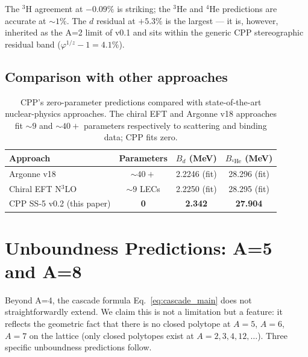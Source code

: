 \documentclass[11pt,letterpaper]{article}
\newcommand{\phig}{\varphi}
\newcommand{\Bd}{B_{d}}
\begin{document}
The ${}^{3}\mathrm{H}$ agreement at $-0.09\%$ is striking; the ${}^{3}\mathrm{He}$ and ${}^{4}\mathrm{He}$ predictions are accurate at $\sim 1\%$. The $d$ residual at $+5.3\%$ is the largest --- it is, however, inherited as the A=2 limit of v0.1 and sits within the generic CPP stereographic residual band ($\phig^{1/z} - 1 = 4.1\%$).

\subsection{Comparison with other approaches}

\begin{table}[H]
\centering
\caption{CPP's zero-parameter predictions compared with state-of-the-art nuclear-physics approaches. The chiral EFT and Argonne v18 approaches fit $\sim 9$ and $\sim 40+$ parameters respectively to scattering and binding data; CPP fits zero.}
\label{tab:comparison}
\begin{tabular}{@{}lccc@{}}
\toprule
Approach & Parameters & $\Bd$ (MeV) & $B_{^{4}\mathrm{He}}$ (MeV) \\
\midrule
Argonne v18 \citep{argonne_v18} & $\sim 40+$ & 2.2246 (fit) & 28.296 (fit) \\
Chiral EFT N$^{3}$LO & $\sim 9$ LECs & 2.2250 (fit) & 28.295 (fit) \\
CPP SS-5 v0.2 (this paper) & \textbf{0} & \textbf{2.342} & \textbf{27.904} \\
\bottomrule
\end{tabular}
\end{table}

\section{Unboundness Predictions: A=5 and A=8}
\label{sec:unbound}

Beyond A=4, the cascade formula Eq.~\eqref{eq:cascade_main} does not straightforwardly extend. We claim this is not a limitation but a feature: it reflects the geometric fact that there is no closed polytope at $A=5$, $A=6$, $A=7$ on the lattice (only closed polytopes exist at $A=2,3,4,12,\ldots$). Three specific unboundness predictions follow.
\end{document}
